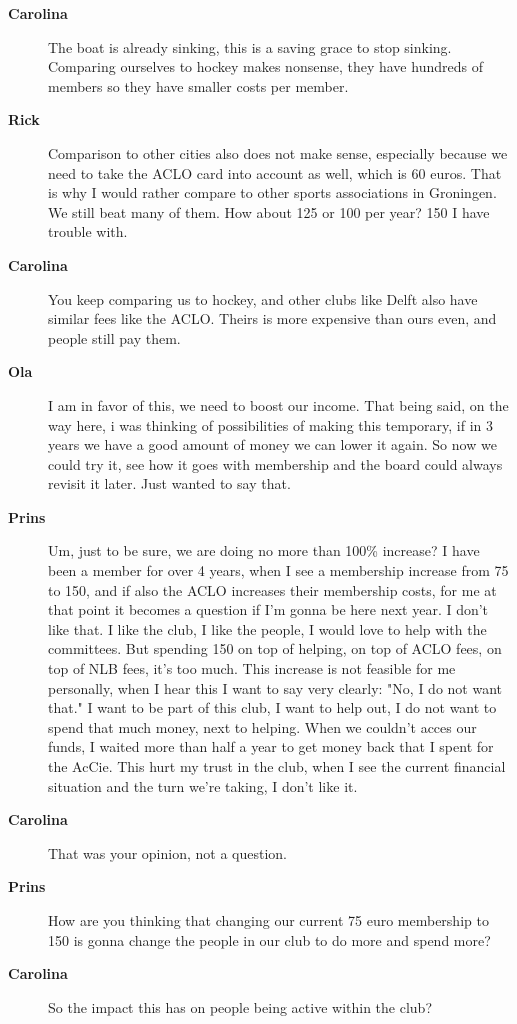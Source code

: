 \documentclass[12pt, a4paper]{article}
\newcommand{\speak}[2]{\begin{description}\item[\textbf{#1}]#2\end{description}}
\begin{document}
\speak{Carolina}{The boat is already sinking, this is a saving grace to stop sinking. Comparing ourselves to hockey makes nonsense, they have hundreds of members so they have smaller costs per member.}

\speak{Rick}{Comparison to other cities also does not make sense, especially because we need to take the ACLO card into account as well, which is 60 euros. That is why I would rather compare to other sports associations in Groningen. We still beat many of them. How about 125 or 100 per year? 150 I have trouble with.}

\speak{Carolina}{You keep comparing us to hockey, and other clubs like Delft also have similar fees like the ACLO. Theirs is more expensive than ours even, and people still pay them.}

\speak{Ola}{I am in favor of this, we need to boost our income. That being said, on the way here, i was thinking of possibilities of making this temporary, if in 3 years we have a good amount of money we can lower it again. So now we could try it, see how it goes with membership and the board could always revisit it later. Just wanted to say that.}

\speak{Prins}{Um, just to be sure, we are doing no more than 100\% increase? I have been a member for over 4 years, when I see a membership increase from 75 to 150, and if also the ACLO increases their membership costs, for me at that point it becomes a question if I'm gonna be here next year. I don't like that. I like the club, I like the people, I would love to help with the committees. But spending 150 on top of helping, on top of ACLO fees, on top of NLB fees, it's too much. This increase is not feasible for me personally, when I hear this I want to say very clearly: "No, I do not want that." I want to be part of this club, I want to help out, I do not want to spend that much money, next to helping. When we couldn't acces our funds, I waited more than half a year to get money back that I spent for the AcCie. This hurt my trust in the club, when I see the current financial situation and the turn we're taking, I don't like it.}

\speak{Carolina}{That was your opinion, not a question.}

\speak{Prins}{How are you thinking that changing our current 75 euro membership to 150 is gonna change the people in our club to do more and spend more?}

\speak{Carolina}{So the impact this has on people being active within the club?}
\end{document}
